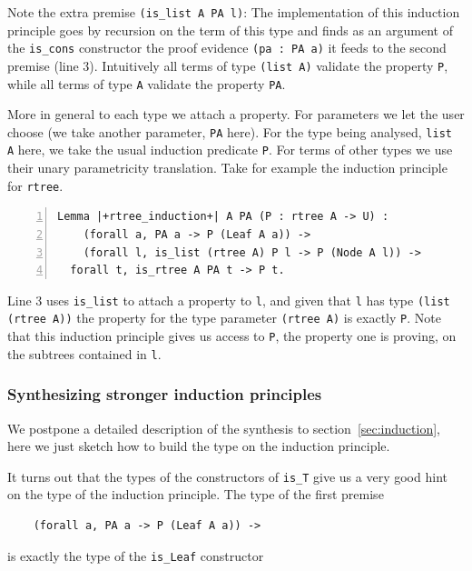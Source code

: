\documentclass[a4paper,UKenglish,cleveref, autoref]{lipics-v2019}
\begin{document}
\noindent
Note the extra premise \lstinline+(is_list A PA l)+: The
implementation of this induction principle
goes by recursion on the term of this type and finds
as an argument of the \lstinline+is_cons+ constructor
the proof evidence \lstinline+(pa : PA a)+ it feeds to the second premise
(line 3). Intuitively all terms of type \lstinline+(list A)+
validate the property \lstinline+P+, while all terms of type
\lstinline+A+ validate the property \lstinline+PA+.

More in general to each type we attach a property. For parameters we
let the user choose (we take another parameter, \lstinline+PA+ here).
For the type being analysed, \lstinline+list A+ here, we take the
usual induction predicate \lstinline+P+.
For terms of other types we use their unary parametricity translation.
Take for example the induction principle for \lstinline+rtree+.

\begin{lstlisting}[numbers=left]
Lemma |+rtree_induction+| A PA (P : rtree A -> U) :
    (forall a, PA a -> P (Leaf A a)) ->
    (forall l, is_list (rtree A) P l -> P (Node A l)) ->
  forall t, is_rtree A PA t -> P t.
\end{lstlisting}

\noindent
Line 3 uses \lstinline+is_list+ to attach a property to \lstinline+l+,
and given that \lstinline+l+ has type \lstinline+(list (rtree A))+
the property for the type parameter \lstinline+(rtree A)+ is
exactly \lstinline+P+.
Note that this induction principle gives us access to \lstinline+P+, the
property one is proving, on the subtrees contained in \lstinline+l+.

\subsubsection{Synthesizing stronger induction principles} %

We postpone a detailed description of the synthesis to
section~\ref{sec:induction}, here we just sketch how to
build the type on the induction principle.

It turns out that the types of the constructors of
\lstinline+is_T+ give us a very good hint on the type
of the induction principle.
The type of the first premise

\begin{lstlisting}
    (forall a, PA a -> P (Leaf A a)) ->
\end{lstlisting}

\noindent
is exactly the type of the \lstinline+is_Leaf+ constructor
\end{document}
